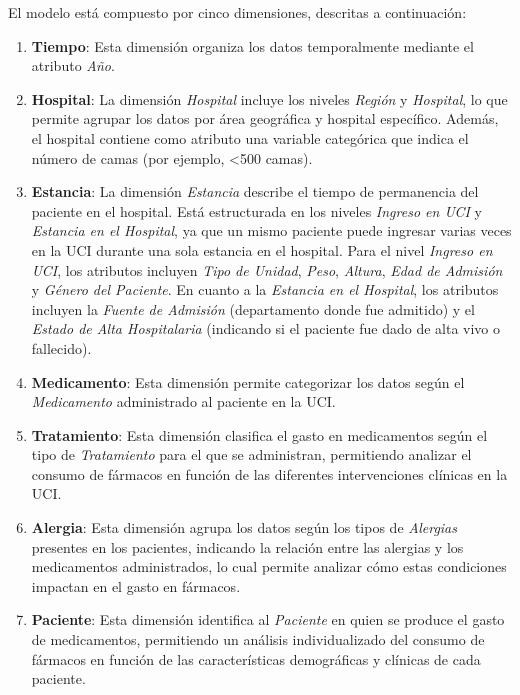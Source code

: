 \documentclass{article}
\begin{document}
El modelo está compuesto por cinco dimensiones, descritas a continuación:

\begin{enumerate}
	\item \textbf{Tiempo}: Esta dimensión organiza los datos temporalmente mediante el atributo \textit{Año}.
	
	\item \textbf{Hospital}: La dimensión \textit{Hospital} incluye los niveles \textit{Región} y \textit{Hospital}, lo que permite agrupar los datos por área geográfica y hospital específico. Además, el hospital contiene como atributo una variable categórica que indica el número de camas (por ejemplo, <500 camas).
	
	\item \textbf{Estancia}: La dimensión \textit{Estancia} describe el tiempo de permanencia del paciente en el hospital. Está estructurada en los niveles \textit{Ingreso en UCI} y \textit{Estancia en el Hospital}, ya que un mismo paciente puede ingresar varias veces en la UCI durante una sola estancia en el hospital. Para el nivel \textit{Ingreso en UCI}, los atributos incluyen \textit{Tipo de Unidad}, \textit{Peso}, \textit{Altura}, \textit{Edad de Admisión} y \textit{Género del Paciente}. En cuanto a la \textit{Estancia en el Hospital}, los atributos incluyen la \textit{Fuente de Admisión} (departamento donde fue admitido) y el \textit{Estado de Alta Hospitalaria} (indicando si el paciente fue dado de alta vivo o fallecido).
	
	\item \textbf{Medicamento}: Esta dimensión permite categorizar los datos según el \textit{Medicamento} administrado al paciente en la UCI.
	

	\item \textbf{Tratamiento}: Esta dimensión clasifica el gasto en medicamentos según el tipo de \textit{Tratamiento} para el que se administran, permitiendo analizar el consumo de fármacos en función de las diferentes intervenciones clínicas en la UCI.
	
	\item \textbf{Alergia}: Esta dimensión agrupa los datos según los tipos de \textit{Alergias} presentes en los pacientes, indicando la relación entre las alergias y los medicamentos administrados, lo cual permite analizar cómo estas condiciones impactan en el gasto en fármacos.
	
	\item \textbf{Paciente}: Esta dimensión identifica al \textit{Paciente} en quien se produce el gasto de medicamentos, permitiendo un análisis individualizado del consumo de fármacos en función de las características demográficas y clínicas de cada paciente.
\end{enumerate}
\end{document}
